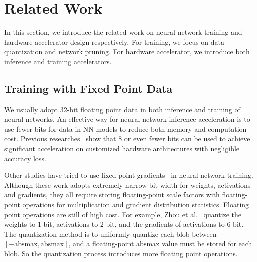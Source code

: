 \section{Related Work}\label{sec:rw}
In this section, we introduce the related work on neural network training and hardware accelerator design respectively. For training, we focus on data quantization and network pruning. For hardware accelerator, we introduce both inference and training accelerators.

\subsection{Training with Fixed Point Data}\label{sec:rw:fixed_train}
We usually adopt 32-bit floating point data in both inference and training of neural networks. An effective way for neural network inference acceleration is to use fewer bits for data in NN models to reduce both memory and computation cost. Previous researches~\cite{han2016eie,qiu2016going} show that 8 or even fewer bits can be used to achieve significant acceleration on customized hardware architectures with negligible accuracy loss. 

Other studies have tried to use fixed-point gradients~\cite{hubara2016binarized, hubara2017quantized, zhou2016dorefa} in neural network training. Although these work adopts extremely narrow bit-width for weights, activations and gradients, they all require storing floating-point scale factors with floating-point operations for multiplication and gradient distribution statistics. Floating point operations are still of high cost. For example, Zhou et al.~\cite{zhou2016dorefa} quantize the weights to 1 bit, activations to 2 bit, and the gradients of activations to 6 bit. The quantization method is to uniformly quantize each blob between $[-\mbox{absmax}, \mbox{absmax}]$, and a floating-point $\mbox{absmax}$ value must be stored for each blob. So the quantization process introduces more floating point operations.

